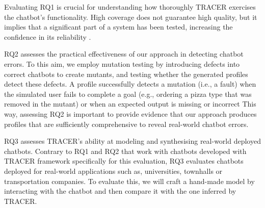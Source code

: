Evaluating RQ1 is crucial for understanding
how thoroughly \ac{TRACER} exercises the chatbot’s functionality.
High coverage does not guarantee high quality,
but it implies that a significant part of a system has been tested,
increasing the confidence in its reliability
\autocite{ammannIntroductionSoftwareTesting2017}.


RQ2 assesses the practical effectiveness
of our approach in detecting chatbot errors.
To this aim, we employ mutation testing
\autocite{demilloHintsTestData1978}
by introducing defects into correct chatbots to create mutants,
and testing whether the generated profiles detect these defects.
A profile successfully detects a mutation (i.e., a fault)
when the simulated user fails to complete a goal
(e.g., ordering a pizza type that was removed in the mutant)
or when an expected output is missing or incorrect
This way, assessing RQ2 is important
to provide evidence that our approach produces
profiles that are sufficiently comprehensive
to reveal real-world chatbot errors.

RQ3 assesses \ac{TRACER}'s ability at modeling and synthesising
real-world deployed chatbots.
Contrary to RQ1 and RQ2 that work with chatbots developed with \ac{TRACER} framework
specifically for this evaluation,
RQ3 evaluates chatbots deployed for real-world applications
such as, universities, townhalls or transportation companies.
To evaluate this, we will craft a hand-made model
by interacting with the chatbot
and then compare it with the one inferred by \ac{TRACER}.
